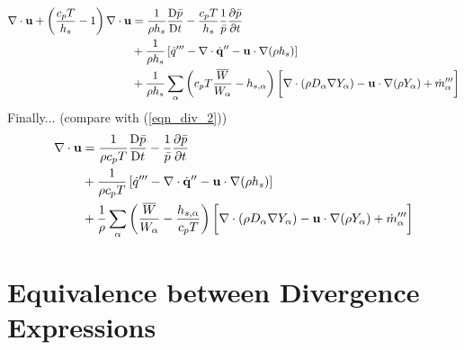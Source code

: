 \begin{align}
\label{eqn_div_5}
\nabla\cdot \mathbf{u} + \left(\frac{c_p T}{h_s} - 1\right)\nabla\cdot \mathbf{u}  &= \frac{1}{\rho h_s}\frac{\mbox{D} \bar{p}}{\mbox{D} t} - \frac{c_p T}{h_s}\frac{1}{\bar{p}} \frac{\partial \bar{p}}{\partial t} \notag\\
&+ \frac{1}{\rho h_s}\left[ \dot{q}^{\prime\prime\prime} - \nabla\cdot \dot{\mathbf{q}}^{\prime\prime} - \mathbf{u} \cdot\nabla (\rho h_s) \right] \notag\\
&+ \frac{1}{\rho h_s} \sum_\alpha \left(c_p T\frac{\overline{W}}{W_\alpha} - h_{s,\alpha} \right) \bigg[ \nabla\cdot (\rho D_\alpha \nabla Y_\alpha) - \mathbf{u} \cdot \nabla (\rho Y_\alpha) + \dot{m}_\alpha^{\prime\prime\prime} \bigg]
\end{align}
Finally... (compare with (\ref{eqn_div_2}))
\begin{align}
\label{eqn_div_6}
\nabla\cdot \mathbf{u} &= \frac{1}{\rho c_p T}\frac{\mbox{D} \bar{p}}{\mbox{D} t} - \frac{1}{\bar{p}} \frac{\partial \bar{p}}{\partial t} \notag\\
&+ \frac{1}{\rho c_p T}\left[ \dot{q}^{\prime\prime\prime} - \nabla\cdot \dot{\mathbf{q}}^{\prime\prime} - \mathbf{u} \cdot\nabla (\rho h_s) \right] \notag\\
&+ \frac{1}{\rho} \sum_\alpha \left(\frac{\overline{W}}{W_\alpha} - \frac{h_{s,\alpha}}{c_p T} \right) \bigg[ \nabla\cdot (\rho D_\alpha \nabla Y_\alpha) - \mathbf{u} \cdot \nabla (\rho Y_\alpha) + \dot{m}_\alpha^{\prime\prime\prime} \bigg]
\end{align}

\section{Equivalence between Divergence Expressions}
\label{app_div_equivalence}

